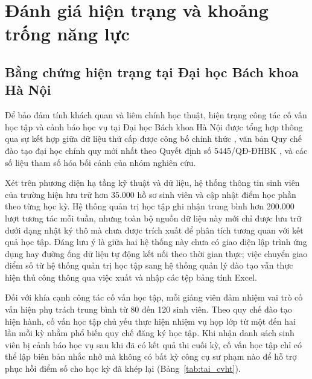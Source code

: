 \section{Đánh giá hiện trạng và khoảng trống năng lực}

\subsection{Bằng chứng hiện trạng tại Đại học Bách khoa Hà Nội}
Để bảo đảm tính khách quan và liêm chính học thuật, hiện trạng công tác cố vấn học tập và cảnh báo học vụ tại Đại học Bách khoa Hà Nội được tổng hợp thông qua sự kết hợp giữa dữ liệu thứ cấp được công bố chính thức \citep{phungnhung2022, tienphong2024}, văn bản Quy chế đào tạo đại học chính quy mới nhất theo Quyết định số 5445/QĐ-ĐHBK \citep{hust2025}, và các số liệu tham số hóa bối cảnh của nhóm nghiên cứu.

Xét trên phương diện hạ tầng kỹ thuật và dữ liệu, hệ thống thông tin sinh viên của trường hiện lưu trữ hơn 35.000 hồ sơ sinh viên và cập nhật điểm học phần theo từng học kỳ. Hệ thống quản trị học tập ghi nhận trung bình hơn 200.000 lượt tương tác mỗi tuần, nhưng toàn bộ nguồn dữ liệu này mới chỉ được lưu trữ dưới dạng nhật ký thô mà chưa được trích xuất để phân tích tương quan với kết quả học tập. Đáng lưu ý là giữa hai hệ thống này chưa có giao diện lập trình ứng dụng hay đường ống dữ liệu tự động kết nối theo thời gian thực; việc chuyển giao điểm số từ hệ thống quản trị học tập sang hệ thống quản lý đào tạo vẫn thực hiện thủ công thông qua việc xuất và nhập các tệp bảng tính Excel.

Đối với khía cạnh công tác cố vấn học tập, mỗi giảng viên đảm nhiệm vai trò cố vấn hiện phụ trách trung bình từ 80 đến 120 sinh viên. Theo quy chế đào tạo hiện hành, cố vấn học tập chủ yếu thực hiện nhiệm vụ họp lớp từ một đến hai lần mỗi kỳ nhằm phổ biến quy chế đăng ký học tập. Khi nhận danh sách sinh viên bị cảnh báo học vụ sau khi đã có kết quả thi cuối kỳ, cố vấn học tập chỉ có thể lập biên bản nhắc nhở mà không có bất kỳ công cụ sư phạm nào để hỗ trợ phục hồi điểm số cho học kỳ đã khép lại (Bảng~\ref{tab:tai_cvht}).

